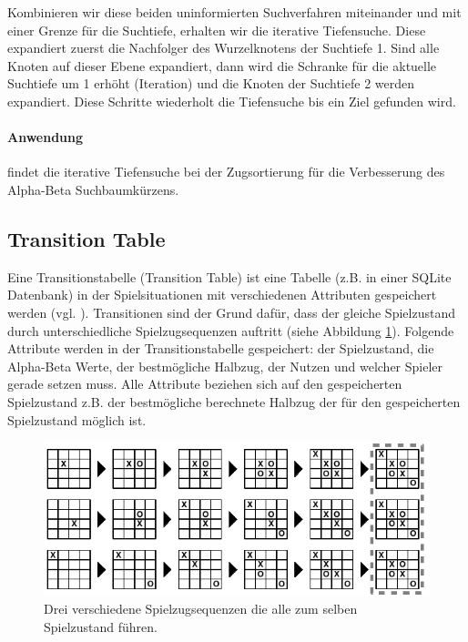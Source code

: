 Kombinieren wir diese beiden uninformierten Suchverfahren miteinander und mit einer Grenze für die Suchtiefe, erhalten wir die iterative Tiefensuche. Diese expandiert zuerst die Nachfolger des Wurzelknotens der Suchtiefe 1. Sind alle Knoten auf dieser Ebene expandiert, dann wird die Schranke für die aktuelle Suchtiefe um 1 erhöht (Iteration) und die Knoten der Suchtiefe 2 werden expandiert. Diese Schritte wiederholt die Tiefensuche bis ein Ziel gefunden wird.  

\paragraph{Anwendung} findet die iterative Tiefensuche bei der Zugsortierung für die Verbesserung des Alpha-Beta Suchbaumkürzens. 


\subsection{Transition Table}
Eine Transitionstabelle (Transition Table) ist eine Tabelle (z.B. in einer SQLite Datenbank) in der Spielsituationen mit verschiedenen Attributen gespeichert werden (vgl. \cite[215\psq]{Russell}). Transitionen sind der Grund dafür, dass der gleiche Spielzustand durch unterschiedliche Spielzugsequenzen auftritt (siehe Abbildung \ref{fig:transitionen_tictactoe}). Folgende Attribute werden in der Transitionstabelle gespeichert: der Spielzustand, die Alpha-Beta Werte, der bestmögliche Halbzug, der Nutzen und welcher Spieler gerade setzen muss. Alle Attribute beziehen sich auf den gespeicherten Spielzustand z.B. der bestmögliche berechnete Halbzug der für den gespeicherten Spielzustand möglich ist. \\

\begin{figure}[!htbp]
  \centering
  \includegraphics{inhalt/abbildungen/transitionen_tictactoe.pdf}
  \caption{Drei verschiedene Spielzugsequenzen die alle zum selben Spielzustand führen.}
  \label{fig:transitionen_tictactoe}
\end{figure} 

